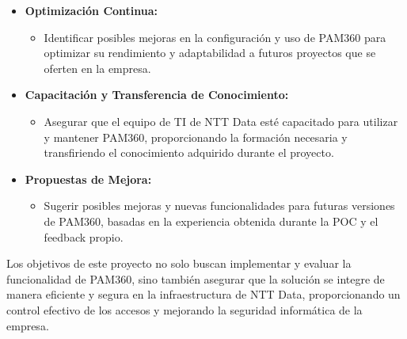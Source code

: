 \begin{itemize}
	\item \textbf{Optimización Continua:}
	\begin{itemize}
		\item Identificar posibles mejoras en la configuración y uso de PAM360 para optimizar su rendimiento y adaptabilidad a futuros proyectos que se oferten en la empresa.
	\end{itemize}
	
	\item \textbf{Capacitación y Transferencia de Conocimiento:}
	\begin{itemize}
		\item Asegurar que el equipo de TI de NTT Data esté capacitado para utilizar y mantener PAM360, proporcionando la formación necesaria y transfiriendo el conocimiento adquirido durante el proyecto.
	\end{itemize}
	
	\item \textbf{Propuestas de Mejora:}
	\begin{itemize}
		\item Sugerir posibles mejoras y nuevas funcionalidades para futuras versiones de PAM360, basadas en la experiencia obtenida durante la POC y el feedback propio.
	\end{itemize}
\end{itemize}

Los objetivos de este proyecto no solo buscan implementar y evaluar la funcionalidad de PAM360, sino también asegurar que la solución se integre de manera eficiente y segura en la infraestructura de NTT Data, proporcionando un control efectivo de los accesos y mejorando la seguridad informática de la empresa.
